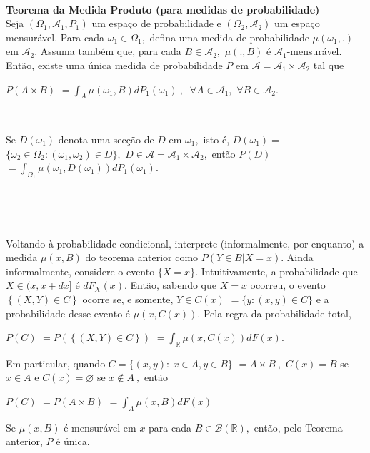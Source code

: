 \documentclass[
]{book}
\begin{document}
\(~\)

\textbf{Teorema da Medida Produto (para medidas de probabilidade)}\\
Seja \((\Omega_1, \mathcal{A}_1,P_1)\) um espaço de probabilidade e \((\Omega_2,\mathcal{A}_2)\) um espaço mensurável. Para cada \(\omega_1 \in \Omega_1,\) defina uma medida de probabilidade \(\mu(\omega_1,.)\) em \(\mathcal{A}_2.\) Assuma também que, para cada \(B \in \mathcal{A}_2,\) \(\mu(.,B)\) é \(\mathcal{A}_1\)-mensurável. Então, existe uma única medida de probabilidade \(P\) em \(\mathcal{A}= \mathcal{A}_1\times\mathcal{A}_2\) tal que

\(P(A\times B)\) \(=\displaystyle\int_A \mu(\omega_1,B)dP_1(\omega_1)~,~\) \(\forall A\in \mathcal{A}_1,\) \(\forall B\in \mathcal{A}_2.\)

\(~\)

Se \(D(\omega_1)\) denota uma secção de \(D\) em \(\omega_1,\) isto é, \(D(\omega_1)=\) \(\{\omega_2\in \Omega_2: (\omega_1,\omega_2)\in D\},\) \(D\in \mathcal{A}=\mathcal{A}_1\times\mathcal{A}_2,\) então \(P(D)\) \(=\displaystyle\int_{\Omega_1}\mu\left(\omega_1,D(\omega_1)\right)dP_1(\omega_1).\)

\(~\)

\(~\)

Voltando à probabilidade condicional, interprete (informalmente, por enquanto) a medida \(\mu(x,B)\) do teorema anterior como \(P(Y\in B| X=x).\) Ainda informalmente, considere o evento \(\{X=x\}\). Intuitivamente, a probabilidade que \(X\in (x,x+dx]\) é \(dF_X(x).\)
Então, sabendo que \(X=x\) ocorreu, o evento \(\left\{(X,Y)\in C\right\}\) ocorre se, e somente, \(Y \in C(x)\) \(=\{y:(x,y)\in C\}\) e a probabilidade desse evento é \(\mu(x,C(x)).\) Pela regra da probabilidade total,

\(P(C)\) \(=P\left(\left\{(X,Y)\in C\right\}\right)\) \(=\displaystyle\int_{\mathbb{R}}\mu\left(x,C(x)\right)dF(x).\)

Em particular, quando \(C=\{(x,y):~ x\in A, y \in B\}\) \(=A\times B~,\) \(C(x)=B\) se \(x\in A\) e \(C(x)=\varnothing\) se \(x \notin A~,\) então

\(P(C)\) \(=P(A\times B)\) \(=\displaystyle\int_A \mu(x,B)dF(x)\)

Se \(\mu(x,B)\) é mensurável em \(x\) para cada \(B\in \mathcal{B}(\mathbb{R}),\) então, pelo Teorema anterior, \(P\) é única.

\(~\)
\end{document}
